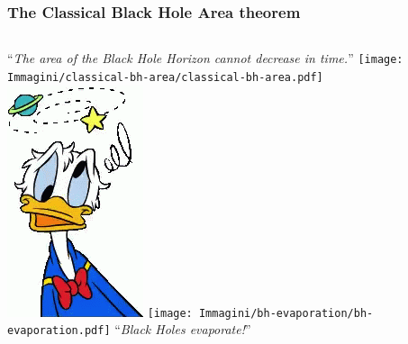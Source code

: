 \documentclass[]{beamer}
\begin{document}
	\begin{frame}
		\frametitle{The Classical Black Hole Area theorem}
		\begin{columns}
			\centering
			``\emph{The area of the Black Hole Horizon cannot decrease in time.}''
			\vskip 15pt
			\texttt{[image: Immagini/classical-bh-area/classical-bh-area.pdf]}
			\centering
			\includegraphics[scale=0.5]{Immagini/donald-duck.png}
			\centering
			\texttt{[image: Immagini/bh-evaporation/bh-evaporation.pdf]}
			``\emph{Black Holes evaporate!}''
		\end{columns}
	\end{frame}
\end{document}
